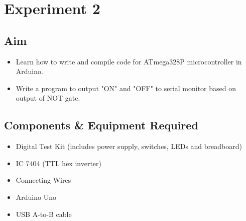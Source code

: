\documentclass[11pt, a4paper]{article}
\begin{document}
\newpage


\section{Experiment 2}

\subsection{Aim}
\begin{itemize}
    \item Learn how to write and compile code for ATmega328P microcontroller in Arduino.
    \item Write a program to output "ON" and "OFF" to serial monitor based on output of NOT gate.
\end{itemize}

\subsection{Components \& Equipment Required}
\begin{itemize}
    \item Digital Test Kit (includes power supply, switches, LEDs and breadboard)
    \item IC 7404 (TTL hex inverter)
    \item Connecting Wires
    \item Arduino Uno
    \item USB A-to-B cable
\end{itemize}
\end{document}
